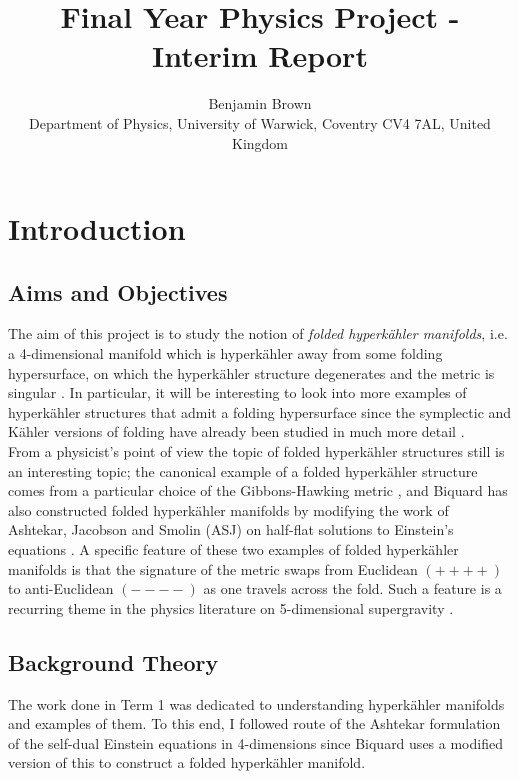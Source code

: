 \documentclass[a4paper,onecolumn,12pt]{article}
\theoremstyle{definition}
\theoremstyle{remark}
\newcommand{\K}{K\"ahler }
\newcommand{\HK}{hyperk\"ahler }
\begin{document}
\title{Final Year Physics Project - Interim Report}

\author{Benjamin Brown \\
        \small
        Department of Physics, University of Warwick,
        Coventry CV4 7AL, United Kingdom}
\date{}


\maketitle

\section{Introduction}

\subsection{Aims and Objectives}

The aim of this project is to study the notion of \emph{folded hyperk{\"a}hler manifolds}, i.e. a 4-dimensional manifold which is hyperk{\"a}hler away from some folding hypersurface, on which the hyperk{\"a}hler structure degenerates and the metric is singular \cite{hitchin_2015,biquard_2015}. In particular, it will be interesting to look into more examples of \HK structures that admit a folding hypersurface since the symplectic and \K versions of folding have already been studied in much more detail \cite{dasilva_2000,baykur_2006}.\\
From a physicist's point of view the topic of folded \HK structures still is an interesting topic; the canonical example of a folded \HK structure comes from a particular choice of the Gibbons-Hawking metric \cite{hitchin_2015}, and Biquard \cite{biquard_2015} has also constructed folded \HK manifolds by modifying the work of Ashtekar, Jacobson and Smolin (ASJ) on half-flat solutions to Einstein's equations \cite{ashtekar_1988}. A specific feature of these two examples of folded \HK manifolds is that the signature of the metric swaps from Euclidean $(++++)$ to anti-Euclidean $(----)$ as one travels across the fold. Such a feature is a recurring theme in the physics literature on 5-dimensional supergravity \cite{gibbons_2013}.

\newpage
\subsection{Background Theory}
The work done in Term 1 was dedicated to understanding \HK manifolds and examples of them. To this end, I followed route of the Ashtekar formulation \cite{ashtekar_1987} of the self-dual Einstein equations in 4-dimensions since Biquard \cite{biquard_2015} uses a modified version of this to construct a folded \HK manifold.
\end{document}
